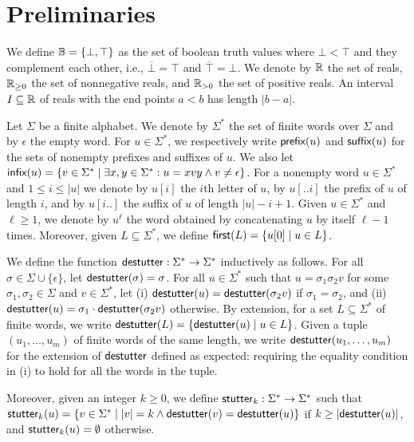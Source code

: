 \section{Preliminaries}

We define $\mathbb{B} = \{ \bot, \top \}$ as the set of boolean truth values where $\bot < \top$ and they complement each other, i.e., $\overline{\bot} = \top$ and $\overline{\top} = \bot$.
We denote by $\mathbb{R}$ the set of reals, $\mathbb{R}_{\geq 0}$ the set of nonnegative reals, and $\mathbb{R}_{> 0}$ the set of positive reals.
An interval $I \subseteq \mathbb{R}$ of reals with the end points $a < b$ has length $|b-a|$.

Let $\Sigma$ be a finite alphabet.
We denote by $\Sigma^*$ the set of finite words over $\Sigma$ and by $\epsilon$ the empty word.
For $u \in \Sigma^*$, we respectively write $\textsf{prefix}(u)$ and $\textsf{suffix}(u)$ for the sets of nonempty prefixes and suffixes of $u$.
We also let $\infx(u) = \{v \in \Sigma^* \st \exists x,y \in \Sigma^* : u = xvy \land v \neq \epsilon\}$.
For a nonempty word $u \in \Sigma^*$ and $1 \leq i \leq |u|$ we denote by $u[i]$ the $i$th letter of $u$, by $u[..i]$ the prefix of $u$ of length $i$, and by $u[i..]$ the suffix of $u$ of length $|u| - i + 1$. 
Given $u \in \Sigma^*$ and $\ell \geq 1$, we denote by $u^\ell$ the word obtained by concatenating $u$ by itself $\ell - 1$ times.
Moreover, given $L \subseteq \Sigma^*$, we define $\first(L) = \{ u[0] \st u \in L\}$.

We define the function $\mathsf{destutter} : \Sigma^* \to \Sigma^*$ inductively as follows.
For all $\sigma \in \Sigma \cup \{\epsilon\}$, let $\mathsf{destutter}(\sigma) = \sigma$.
For all $u \in \Sigma^*$ such that $u = \sigma_1 \sigma_2 v$ for some $\sigma_1,\sigma_2 \in \Sigma$ and $v \in \Sigma^*$, let (i) $\mathsf{destutter}(u) = \mathsf{destutter}(\sigma_2 v)$ if $\sigma_1 = \sigma_2$, and (ii) $\mathsf{destutter}(u) = \sigma_1 \cdot \mathsf{destutter}(\sigma_2 v)$ otherwise.
By extension, for a set $L \subseteq \Sigma^*$ of finite words, we write $\destutter(L) = \{\destutter(u) \st u \in L\}$.
Given a tuple $(u_1, \ldots, u_m)$ of finite words of the same length, we write $\mathsf{destutter}(u_1, \ldots, u_m)$ for the extension of $\mathsf{destutter}$ defined as expected: requiring the equality condition in (i) to hold for all the words in the tuple.


Moreover, given an integer $k \geq 0$, we define $\mathsf{stutter}_k : \Sigma^* \to \Sigma^*$ such that $\stutter_k(u) = \{v \in \Sigma^* \st |v| = k \land \destutter(v) = \destutter(u)\}$ if $k \geq |\mathsf{destutter}(u)|$, and $\mathsf{stutter}_k(u) = \emptyset$ otherwise.

